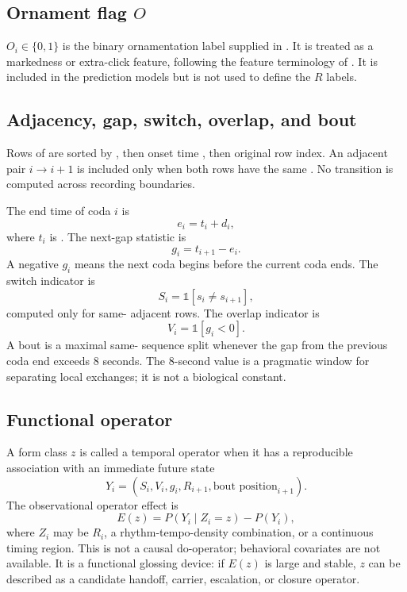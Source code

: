\documentclass[11pt]{article}
\begin{document}
\subsection{Ornament flag \texorpdfstring{$O$}{O}}

$O_i \in \{0,1\}$ is the binary ornamentation label supplied in . It is treated as a markedness or extra-click feature, following the feature terminology of \citet{sharma2024contextual}. It is included in the prediction models but is not used to define the $R$ labels.

\subsection{Adjacency, gap, switch, overlap, and bout}

Rows of  are sorted by , then onset time , then original row index. An adjacent pair $i \rightarrow i+1$ is included only when both rows have the same . No transition is computed across recording boundaries.

The end time of coda $i$ is
\begin{equation}
    e_i = t_i + d_i,
\end{equation}
where $t_i$ is . The next-gap statistic is
\begin{equation}
    g_i = t_{i+1} - e_i.
\end{equation}
A negative $g_i$ means the next coda begins before the current coda ends. The switch indicator is
\begin{equation}
    S_i = \mathbb{1}[s_i \neq s_{i+1}],
\end{equation}
computed only for same- adjacent rows. The overlap indicator is
\begin{equation}
    V_i = \mathbb{1}[g_i < 0].
\end{equation}
A bout is a maximal same- sequence split whenever the gap from the previous coda end exceeds 8 seconds. The 8-second value is a pragmatic window for separating local exchanges; it is not a biological constant.

\subsection{Functional operator}

A form class $z$ is called a temporal operator when it has a reproducible association with an immediate future state
\begin{equation}
    Y_i = (S_i, V_i, g_i, R_{i+1}, \text{bout position}_{i+1}).
\end{equation}
The observational operator effect is
\begin{equation}
    E(z) = P(Y_i \mid Z_i=z) - P(Y_i),
\end{equation}
where $Z_i$ may be $R_i$, a rhythm-tempo-density combination, or a continuous timing region. This is not a causal do-operator; behavioral covariates are not available. It is a functional glossing device: if $E(z)$ is large and stable, $z$ can be described as a candidate handoff, carrier, escalation, or closure operator.
\end{document}

